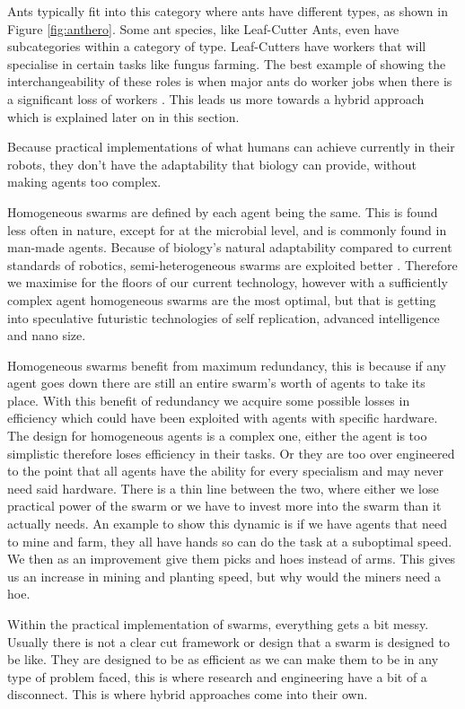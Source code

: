 \documentclass{UoYCSproject}
\begin{document}
Ants typically fit into this category where ants have different types, as shown in Figure \ref{fig:anthero}. 
Some ant species, like Leaf-Cutter Ants, even have subcategories within a category of type. 
Leaf-Cutters have workers that will specialise in certain tasks like fungus farming. 
The best example of showing the interchangeability of these roles is when major ants do worker jobs when there is a significant loss of workers \cite{Swarm intellegiegence}. 
This leads us more towards a hybrid approach which is explained later on in this section.

Because practical implementations of what humans can achieve currently in their robots, they don’t have the adaptability that biology can provide, without making agents too complex.

Homogeneous swarms are defined by each agent being the same. 
This is found less often in nature, except for at the microbial level, and is commonly found in man-made agents. 
Because of biology's natural adaptability compared to current standards of robotics, semi-heterogeneous swarms are exploited better \cite{Swarm robotics reviewed, Swarm intellegiegence}. 
Therefore we maximise for the floors of our current technology, however with a sufficiently complex agent homogeneous swarms are the most optimal, but that is getting into speculative futuristic technologies of self replication, advanced intelligence and nano size.

Homogeneous swarms benefit from maximum redundancy, this is because if any agent goes down there are still an entire swarm's worth of agents to take its place. 
With this benefit of redundancy we acquire some possible losses in efficiency which could have been exploited with agents with specific hardware. 
The design for homogeneous agents is a complex one, either the agent is too simplistic therefore loses efficiency in their tasks. 
Or they are too over engineered to the point that all agents have the ability for every specialism and may never need said hardware. 
There is a thin line between the two, where either we lose practical power of the swarm or we have to invest more into the swarm than it actually needs. 
An example to show this dynamic is if we have agents that need to mine and farm, they all have hands so can do the task at a suboptimal speed. 
We then as an improvement give them picks and hoes instead of arms. 
This gives us an increase in mining and planting speed, but why would the miners need a hoe.

Within the practical implementation of swarms, everything gets a bit messy. 
Usually there is not a clear cut framework or design that a swarm is designed to be like. 
They are designed to be as efficient as we can make them to be in any type of problem faced, this is where research and engineering have a bit of a disconnect. 
This is where hybrid approaches come into their own.
\end{document}

